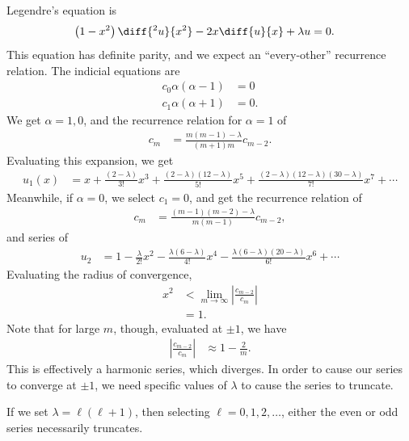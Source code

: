 \documentclass[10pt]{mypackage}
\begin{document}
  \begin{example}
    Legendre's equation is
    \begin{align*}
      \left( 1-x^2 \right)\diff{^2u}{x^2} - 2x\diff{u}{x} + \lambda u &= 0.
    \end{align*}
    This equation has definite parity, and we expect an ``every-other'' recurrence relation. The indicial equations are
    \begin{align*}
      c_0\alpha\left( \alpha - 1 \right) &= 0\\
      c_1\alpha\left( \alpha + 1 \right) &= 0.
    \end{align*}
    We get $\alpha = 1,0$, and the recurrence relation for $\alpha = 1$ of
    \begin{align*}
      c_m &= \frac{m\left( m-1 \right)-\lambda}{\left( m+1 \right)m}c_{m-2}.
    \end{align*}
    Evaluating this expansion, we get
    \begin{align*}
      u_1(x) &= x + \frac{\left( 2-\lambda \right)}{3!}x^3 + \frac{\left( 2-\lambda \right)\left( 12-\lambda \right)}{5!}x^5 + \frac{\left( 2-\lambda \right)\left( 12-\lambda \right)\left( 30-\lambda \right)}{7!}x^7 + \cdots
    \end{align*}
    Meanwhile, if $\alpha = 0$, we select $c_1 = 0$, and get the recurrence relation of
    \begin{align*}
      c_m &= \frac{\left( m-1 \right)\left( m-2 \right)-\lambda}{m\left( m-1 \right)}c_{m-2},
    \end{align*}
    and series of
    \begin{align*}
      u_2 &= 1 - \frac{\lambda}{2!}x^2 - \frac{\lambda\left( 6-\lambda \right)}{4!}x^4 - \frac{\lambda\left( 6-\lambda \right)\left( 20-\lambda \right)}{6!}x^6 + \cdots
    \end{align*}
    Evaluating the radius of convergence,
    \begin{align*}
      x^2 &< \lim_{m\rightarrow\infty} \left\vert \frac{c_{m-2}}{c_m} \right\vert\\
          &= 1.
    \end{align*}
    Note that for large $m$, though, evaluated at $\pm 1$, we have
    \begin{align*}
      \left\vert \frac{c_{m-2}}{c_m} \right\vert &\approx 1- \frac{2}{m}.
    \end{align*}
    This is effectively a harmonic series, which diverges. In order to cause our series to converge at $\pm 1$, we need specific values of $\lambda$ to cause the series to truncate.\newline

    If we set $\lambda = \ell\left( \ell + 1 \right)$, then selecting $\ell = 0,1,2,\dots$, either the even or odd series necessarily truncates.
  \end{example}
\end{document}
